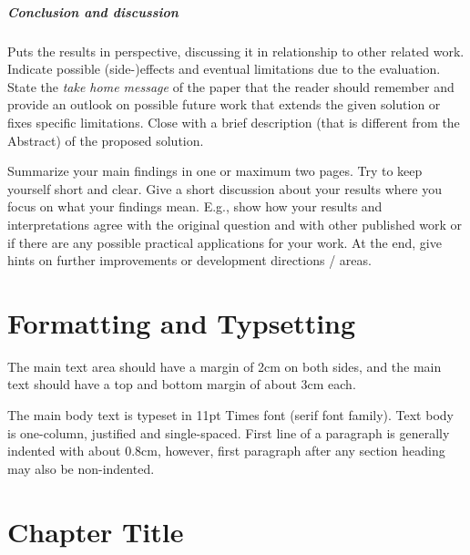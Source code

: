 \documentclass[11pt, a4paper,oneside,chapterprefix=false]{scrbook}
\begin{document}
\paragraph{Conclusion and discussion}

Puts the results in perspective, discussing it in relationship to other related work. Indicate possible (side-)effects and eventual limitations due to the evaluation. State the {\em take home message} of the paper that the reader should remember and provide an outlook on possible future work that extends the given solution or fixes specific limitations. Close with a brief description (that is different from the Abstract) of the proposed solution.

Summarize your main findings in one or maximum two pages. Try to keep yourself short and clear. Give a short discussion about your results where you focus on what your findings mean. E.g., show how your results and interpretations agree with the original question and with other published work  or if there are any possible practical applications for your work. At the end, give hints on further improvements or development directions / areas. 


\chapter{Formatting and Typsetting} \label{chp:formatting}

The main text area should have a margin of 2cm on both sides, and the main text should have a top and bottom margin of about 3cm each.

The main body text is typeset in 11pt Times font (serif font family). Text body is one-column, justified and single-spaced. First line of a paragraph is generally indented with about 0.8cm, however, first paragraph after any section heading may also be non-indented.



\chapter{Chapter Title} \label{chp:one}
\end{document}
